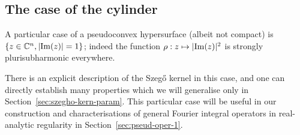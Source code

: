 \documentclass[10pt]{amsart}
\makeatletter
\theoremstyle{definition}\newtheorem{defi}[theo]{Definition}\newtheorem{rema}[theo]{Remark}\newtheorem{exam}[theo]{Example}\newtheorem{exem}[theo]{Example}\newtheorem{nota}[theo]{Notation}
\DeclareMathOperator{\diag}{diag}
\DeclareMathOperator{\im}{Im}
\newcommand\1{\mathds{1}}
\newcommand{\R}{\mathbb{R}}
\newcommand{\C}{\mathbb{C}}
\newcommand{\dd}{\mathrm{d}}
\let\save@mathaccent\mathaccent
\newcommand*\if@single[3]{%
  \setbox0\hbox{${\mathaccent"0362{#1}}^H$}%
  \setbox2\hbox{${\mathaccent"0362{\kern0pt#1}}^H$}%
  \ifdim\ht0=\ht2 #3\else #2\fi
  }
\newcommand*\rel@kern[1]{\kern#1\dimexpr\macc@kerna}
\newcommand*\widebar[1]{\@ifnextchar^{{\wide@bar{#1}{0}}}{\wide@bar{#1}{1}}}
\newcommand*\wide@bar[2]{\if@single{#1}{\wide@bar@{#1}{#2}{1}}{\wide@bar@{#1}{#2}{2}}}
\newcommand*\wide@bar@[3]{%
  \begingroup
  \def\mathaccent##1##2{%
    \let\mathaccent\save@mathaccent
    \if#32 \let\macc@nucleus\first@char \fi
    \setbox\z@\hbox{$\macc@style{\macc@nucleus}_{}$}%
    \setbox\tw@\hbox{$\macc@style{\macc@nucleus}{}_{}$}%
    \dimen@\wd\tw@
    \advance\dimen@-\wd\z@
    \divide\dimen@ 3
    \@tempdima\wd\tw@
    \advance\@tempdima-\scriptspace
    \divide\@tempdima 10
    \advance\dimen@-\@tempdima
    \ifdim\dimen@>\z@ \dimen@0pt\fi
    \rel@kern{0.6}\kern-\dimen@
    \if#31
      \overline{\rel@kern{-0.6}\kern\dimen@\macc@nucleus\rel@kern{0.4}\kern\dimen@}%
      \advance\dimen@0.4\dimexpr\macc@kerna
      \let\final@kern#2%
      \ifdim\dimen@<\z@ \let\final@kern1\fi
      \if\final@kern1 \kern-\dimen@\fi
    \else
      \overline{\rel@kern{-0.6}\kern\dimen@#1}%
    \fi
  }%
  \macc@depth\@ne
  \let\math@bgroup\@empty \let\math@egroup\macc@set@skewchar
  \mathsurround\z@ \frozen@everymath{\mathgroup\macc@group\relax}%
  \macc@set@skewchar\relax
  \let\mathaccentV\macc@nested@a
  \if#31
    \macc@nested@a\relax111{#1}%
  \else
    \def\gobble@till@marker##1\endmarker{}%
    \futurelet\first@char\gobble@till@marker#1\endmarker
    \ifcat\noexpand\first@char A\else
      \def\first@char{}%
    \fi
    \macc@nested@a\relax111{\first@char}%
  \fi
  \endgroup
}
\let\oldbar\bar
\renewcommand*{\bar}[1]{{\mathchoice{\widebar{#1}}{\widebar{#1}}{\widebar{#1}}{\oldbar{#1}}}}
\let\oldmapsto\mapsto
\renewcommand*{\mapsto}{\mathchoice{\longmapsto}{\oldmapsto}{\oldmapsto}{\oldmapsto}}
\makeatother
\begin{document}
\subsection{The case of the cylinder}\label{sec:an-exampl-eucl}

A particular case of a pseudoconvex hypersurface (albeit not compact) is $\{z\in \C^n,\linebreak \lvert\im(z)|=1\}$; indeed the function $\rho:z\mapsto \lvert\im(z)|^2$ is strongly plurisubharmonic everywhere.

There is an explicit description of the Szeg\H{o} kernel in this case, and one can directly establish many properties which we will generalise only in Section~\ref{sec:szegho-kern-param}. This particular case will be useful in our construction and characterisations of general {Fourier integral operators} in real-analytic regularity in Section~\ref{sec:pseud-oper-1}.

\end{document}
